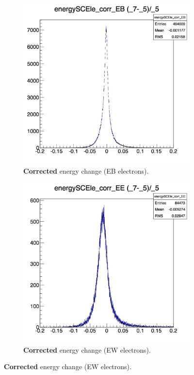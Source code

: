 \documentclass[10pt]{article}
\begin{document}
\begin{figure}[h!]
\begin{subfigure}[b]{0.4\textwidth}
        \end{subfigure}
        ~ %
        \begin{subfigure}[b]{0.4\textwidth}
                \includegraphics[width=\textwidth]{Plots/corrEnergySC_EB}
                \caption{\textbf{Corrected} energy change (EB electrons).}
                \label{corrEB}
               
        \end{subfigure}
         \begin{subfigure}[b]{0.4\textwidth}
                \includegraphics[width=\textwidth]{Plots/corrEnergySC_EE}
                \caption{\textbf{Corrected} energy change (EW electrons).}
                \label{corrEE}
              

\end{subfigure}
\end{figure}
\end{document}
